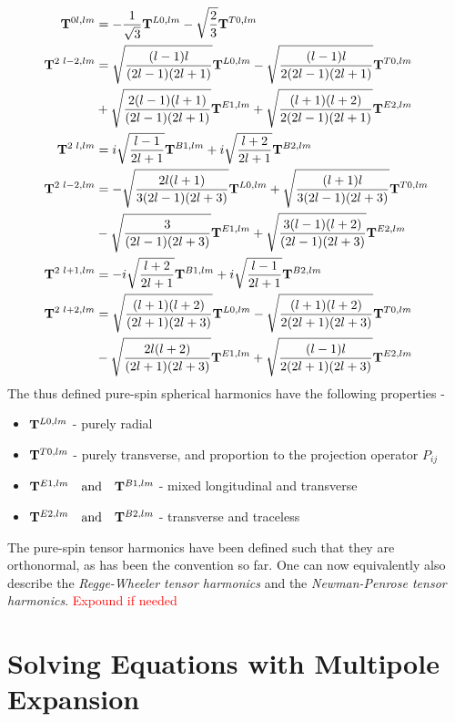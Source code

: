 \documentclass[a4paper,11pt]{article}
\begin{document}
\begin{align*}
 \vb{T}^{0l,lm} &= - \dfrac{1}{\sqrt{3}}\vb{T}^{L0,lm} - \sqrt{\dfrac{2}{3}}\vb{T}^{T0,lm} \\
\vb{T}^{2 \text{ }l-2,lm} &= \sqrt{\dfrac{(l-1)l}{(2l-1)(2l+1)}}  \vb{T}^{L0,lm} - \sqrt{\dfrac{(l-1)l}{2(2l-1)(2l+1)}}  \vb{T}^{T0,lm} \\
&+ \sqrt{\dfrac{2(l-1)(l+1)}{(2l-1)(2l+1)}}  \vb{T}^{E1,lm} + \sqrt{\dfrac{(l+1)(l+2)}{2(2l-1)(2l+1)}}  \vb{T}^{E2,lm} \\
\vb{T}^{2 \text{ }l,lm} &= i \sqrt{\dfrac{l-1}{2l+1}} \vb{T}^{B1,lm}+  i \sqrt{\dfrac{l+2}{2l+1}} \vb{T}^{B2,lm}\\
\vb{T}^{2 \text{ }l-2,lm} &= -\sqrt{\dfrac{2l(l+1)}{3(2l-1)(2l+3)}}  \vb{T}^{L0,lm} + \sqrt{\dfrac{(l+1)l}{3(2l-1)(2l+3)}}  \vb{T}^{T0,lm} \\
&- \sqrt{\dfrac{3}{(2l-1)(2l+3)}}  \vb{T}^{E1,lm} + \sqrt{\dfrac{3(l-1)(l+2)}{(2l-1)(2l+3)}}  \vb{T}^{E2,lm}
\\
\vb{T}^{2 \text{ }l+1,lm} &= -i \sqrt{\dfrac{l+2}{2l+1}} \vb{T}^{B1,lm}+  i \sqrt{\dfrac{l-1}{2l+1}} \vb{T}^{B2,lm}
\\
\vb{T}^{2 \text{ }l+2,lm} &= \sqrt{\dfrac{(l+1)(l+2)}{(2l+1)(2l+3)}}  \vb{T}^{L0,lm} - \sqrt{\dfrac{(l+1)(l+2)}{2(2l+1)(2l+3)}}  \vb{T}^{T0,lm} \\
&- \sqrt{\dfrac{2l(l+2)}{(2l+1)(2l+3)}}  \vb{T}^{E1,lm} + \sqrt{\dfrac{(l-1)l}{2(2l+1)(2l+3)}}  \vb{T}^{E2,lm} 
\end{align*}
The thus defined pure-spin spherical harmonics have the following properties -
\begin{itemize}
	\item $\vb{T}^{L0,lm}$ - purely radial
	\item $\vb{T}^{T0,lm}$ - purely transverse, and proportion to the projection operator $ P_{ij} $
	\item $ \vb{T}^{E1,lm} \qq{and} \vb{T}^{B1,lm}$ - mixed longitudinal and transverse
	\item  $ \vb{T}^{E2,lm} \qq{and} \vb{T}^{B2,lm}$ - transverse and traceless
\end{itemize}
The pure-spin tensor harmonics have been defined such that they are orthonormal, as has been the convention so far. One can now equivalently also describe the \textit{Regge-Wheeler tensor harmonics} and the \textit{Newman-Penrose tensor harmonics}. \textcolor{red}{Expound if needed}
\section{Solving Equations with Multipole Expansion}
\end{document}
